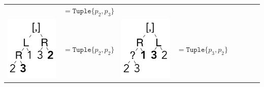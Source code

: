 \documentclass[a4paper,english]{lipics-v2019}
\newcommand{\xt}[1]{\texttt{#1}}
\newcommand{\tuple}[1]{\xt{Tuple\{}#1\xt{\}}}
\begin{document}
{\begin{tabular}{@{}l@{~}ll@{~}ll@{~}ll@{~}l}
\begin{minipage}{1.2cm}
\end{minipage} &  $ =   \tuple{p_2,p_3} $ \\
\begin{minipage}{1.2cm}\includegraphics[scale=.25]{figures/tree5.pdf} 
\end{minipage} &  $ =   \tuple{p_2,p_2} $  &
\begin{minipage}{1.2cm}\includegraphics[scale=.25]{figures/tree6.pdf} 
\end{minipage} &  $ =   \tuple{p_3,p_2} $ 

\end{tabular}}
\end{document}
